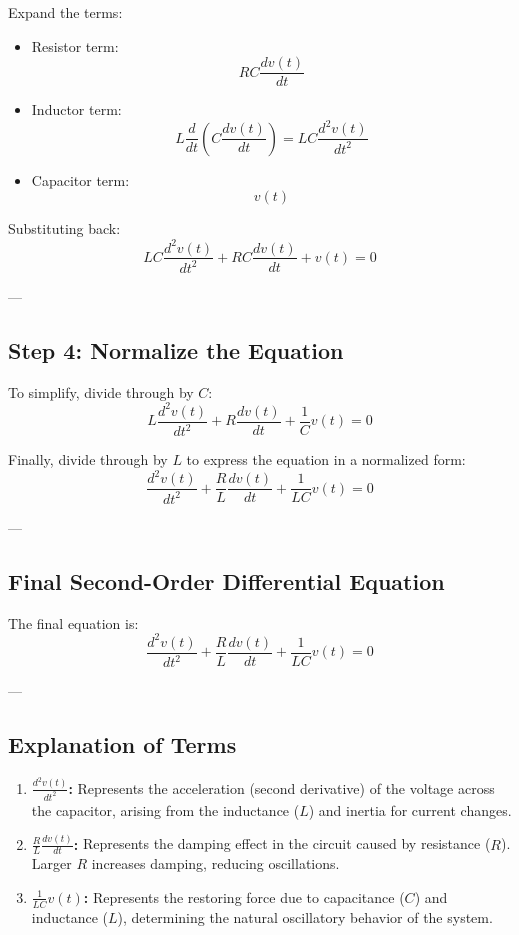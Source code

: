 \documentclass[12pt]{article}
\begin{document}
Expand the terms:
\begin{itemize}
    \item Resistor term:
    \[
    R C \frac{dv(t)}{dt}
    \]

    \item Inductor term:
    \[
    L \frac{d}{dt} \left(C \frac{dv(t)}{dt}\right) = L C \frac{d^2v(t)}{dt^2}
    \]

    \item Capacitor term:
    \[
    v(t)
    \]
\end{itemize}

Substituting back:
\[
L C \frac{d^2v(t)}{dt^2} + R C \frac{dv(t)}{dt} + v(t) = 0 \tag{3}
\]

---

\subsection*{Step 4: Normalize the Equation}

To simplify, divide through by \( C \):
\[
L \frac{d^2v(t)}{dt^2} + R \frac{dv(t)}{dt} + \frac{1}{C} v(t) = 0
\]

Finally, divide through by \( L \) to express the equation in a normalized form:
\[
\frac{d^2v(t)}{dt^2} + \frac{R}{L} \frac{dv(t)}{dt} + \frac{1}{L C} v(t) = 0 \tag{4}
\]

---

\subsection*{Final Second-Order Differential Equation}

The final equation is:
\[
\frac{d^2v(t)}{dt^2} + \frac{R}{L} \frac{dv(t)}{dt} + \frac{1}{L C} v(t) = 0 \tag{5}
\]

---

\subsection*{Explanation of Terms}

\begin{enumerate}
    \item \textbf{\(\frac{d^2v(t)}{dt^2}\):}
    Represents the acceleration (second derivative) of the voltage across the capacitor, arising from the inductance (\( L \)) and inertia for current changes.

    \item \textbf{\(\frac{R}{L} \frac{dv(t)}{dt}\):}
    Represents the damping effect in the circuit caused by resistance (\( R \)). Larger \( R \) increases damping, reducing oscillations.

    \item \textbf{\(\frac{1}{L C} v(t)\):}
    Represents the restoring force due to capacitance (\( C \)) and inductance (\( L \)), determining the natural oscillatory behavior of the system.
\end{enumerate}
\end{document}
